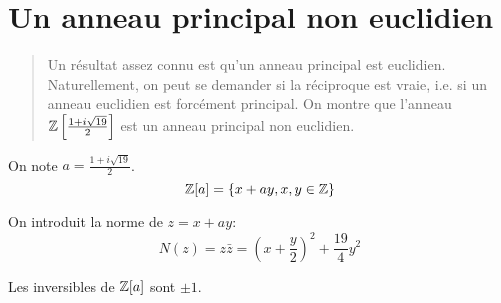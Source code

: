 \documentclass[../main.tex]{subfiles}
\begin{document}
\section{Un anneau principal non euclidien}
\begin{abstract}
    Un résultat assez connu est qu'un anneau principal est euclidien. Naturellement, on peut se demander si la réciproque est vraie, i.e.
    si un anneau euclidien est forcément principal. 
    On montre que l'anneau \(\mathbb{Z}\left[\frac{1+i\sqrt{19}}{2}\right]\) est un anneau principal non euclidien.
\end{abstract}
On note \(a = \frac{1+i\sqrt{19}}{2}\).
\begin{equation}
    \mathbb{Z}[a] = \{x+ay, x,y\in\mathbb{Z}\}
\end{equation}

On introduit la norme de \(z = x+ay\):
\begin{equation}
    N(z) = z\bar{z} = \left(x+\frac{y}{2}\right)^2 + \frac{19}{4}y^2
\end{equation}

\begin{lemma} Les inversibles de \(\mathbb{Z}[a]\) sont \(\pm 1\).
\end{lemma}
\end{document}
